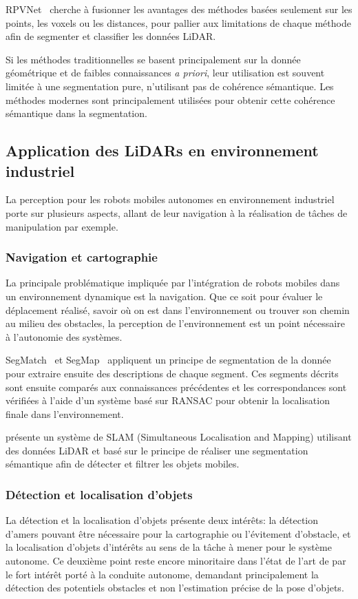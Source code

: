\documentclass[a4paper, french, 10pt, onecolumn, notitlepage, roman]{article}
\begin{document}
RPVNet~\cite{xu:arxiv:2021} cherche à fusionner les avantages des méthodes basées seulement sur les points, les voxels ou les distances, pour pallier aux limitations de chaque méthode afin de segmenter et classifier les données LiDAR.

Si les méthodes traditionnelles se basent principalement sur la donnée géométrique et de faibles connaissances \emph{a priori}, leur utilisation est souvent limitée à une segmentation pure, n'utilisant pas de cohérence sémantique.
Les méthodes modernes sont principalement utilisées pour obtenir cette cohérence sémantique dans la segmentation.

\subsection{Application des LiDARs en environnement industriel}

La perception pour les robots mobiles autonomes en environnement industriel porte sur plusieurs aspects, allant de leur navigation à la réalisation de tâches de manipulation par exemple.

\subsubsection{Navigation et cartographie}
La principale problématique impliquée par l'intégration de robots mobiles dans un environnement dynamique est la navigation.
Que ce soit pour évaluer le déplacement réalisé, savoir où on est dans l'environnement ou trouver son chemin au milieu des obstacles, la perception de l'environnement est un point nécessaire à l'autonomie des systèmes.

SegMatch~\cite{dube:icra:2017} et SegMap~\cite{dube:rss:2018} appliquent un principe de segmentation de la donnée pour extraire ensuite des descriptions de chaque segment.
Ces segments décrits sont ensuite comparés aux connaissances précédentes et les correspondances sont vérifiées à l'aide d'un système basé sur RANSAC pour obtenir la localisation finale dans l'environnement.

\cite{wang:eecr:2023} présente un système de SLAM (Simultaneous Localisation and Mapping) utilisant des données LiDAR et basé sur le principe de réaliser une segmentation sémantique afin de détecter et filtrer les objets mobiles.


\subsubsection{Détection et localisation d'objets}
La détection et la localisation d'objets présente deux intérêts: la détection d'amers pouvant être nécessaire pour la cartographie ou l'évitement d'obstacle, et la localisation d'objets d'intérêts au sens de la tâche à mener pour le système autonome.
Ce deuxième point reste encore minoritaire dans l'état de l'art de par le fort intérêt porté à la conduite autonome, demandant principalement la détection des potentiels obstacles et non l'estimation précise de la pose d'objets.
\end{document}
